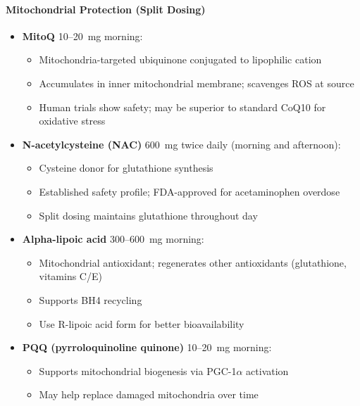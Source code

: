 \paragraph{Mitochondrial Protection (Split Dosing)}

\begin{itemize}
    \item \textbf{MitoQ} 10--20~mg morning:
    \begin{itemize}
        \item Mitochondria-targeted ubiquinone conjugated to lipophilic cation
        \item Accumulates in inner mitochondrial membrane; scavenges ROS at source
        \item Human trials show safety; may be superior to standard CoQ10 for oxidative stress
    \end{itemize}

    \item \textbf{N-acetylcysteine (NAC)} 600~mg twice daily (morning and afternoon):
    \begin{itemize}
        \item Cysteine donor for glutathione synthesis
        \item Established safety profile; FDA-approved for acetaminophen overdose
        \item Split dosing maintains glutathione throughout day
    \end{itemize}

    \item \textbf{Alpha-lipoic acid} 300--600~mg morning:
    \begin{itemize}
        \item Mitochondrial antioxidant; regenerates other antioxidants (glutathione, vitamins C/E)
        \item Supports BH4 recycling
        \item Use R-lipoic acid form for better bioavailability
    \end{itemize}

    \item \textbf{PQQ (pyrroloquinoline quinone)} 10--20~mg morning:
    \begin{itemize}
        \item Supports mitochondrial biogenesis via PGC-1$\alpha$ activation
        \item May help replace damaged mitochondria over time
    \end{itemize}
\end{itemize}

